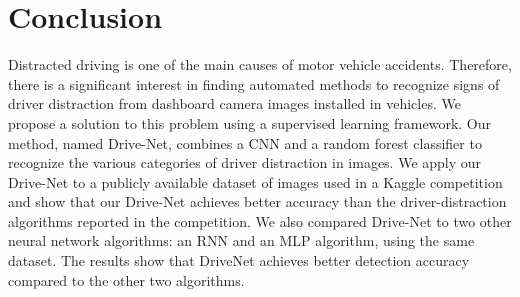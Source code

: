 \pagebreak

\section{Conclusion}
Distracted driving is one of the main causes of motor vehicle accidents. Therefore, there is a significant interest in finding automated methods to recognize signs of driver distraction from dashboard camera images installed in vehicles. We propose a solution to this problem using a supervised learning framework. Our method, named Drive-Net, combines a CNN and a random forest classifier to recognize the various categories of driver distraction in images. We apply our Drive-Net to a publicly available dataset of images used in a Kaggle competition and show that our Drive-Net achieves better accuracy than the driver-distraction algorithms reported in the competition. We also compared Drive-Net to two other neural network algorithms: an RNN and an MLP algorithm, using the same dataset. The results show that DriveNet achieves better detection accuracy compared to the other two algorithms.
